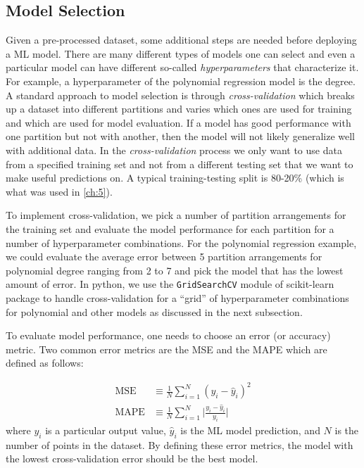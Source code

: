\subsection{Model Selection}
Given a pre-processed dataset, some additional steps are needed before deploying a \gls{ML} model. There are many different types of models one can select and even a particular model can have different so-called \emph{hyperparameters} that characterize it. For example, a hyperparameter of the polynomial regression model is the degree. A standard approach to model selection is through \emph{cross-validation} which breaks up a dataset into different partitions and varies which ones are used for training and which are used for model evaluation. If a model has good performance with one partition but not with another, then the model will not likely generalize well with additional data. In the \emph{cross-validation} process we only want to use data from a specified training set and not from a different testing set that we want to make useful predictions on. A typical training-testing split is 80-20\% (which is what was used in \autoref{ch:5}). 

To implement cross-validation, we pick a number of partition arrangements for the training set and evaluate the model performance for each partition for a number of hyperparameter combinations. For the polynomial regression example, we could evaluate the average error between 5 partition arrangements for polynomial degree ranging from 2 to 7 and pick the model that has the lowest amount of error. In python, we use the \texttt{GridSearchCV} module of scikit-learn \cite{Pedregosa_2011_Scikit-Learn} package to handle cross-validation for a ``grid'' of hyperparameter combinations for polynomial and other models as discussed in the next subsection.

To evaluate model performance, one needs to choose an error (or accuracy) metric. Two common error metrics are the \gls{MSE} and the \gls{MAPE} which are defined as follows: 

\begin{align}
	\text{MSE} &\equiv  \frac{1}{N} \sum_{i=1}^N (y_i - \hat{y}_i)^2 \\
	\text{MAPE} &\equiv \frac{1}{N} \sum_{i=1}^N \lvert \frac{y_i - \hat{y}_i}{y_i} \rvert
\end{align}
where $y_i$ is a particular output value, $\hat{y}_i$ is the \gls{ML} model prediction, and $N$ is the number of points in the dataset. By defining these error metrics, the model with the lowest cross-validation error should be the best model. 

